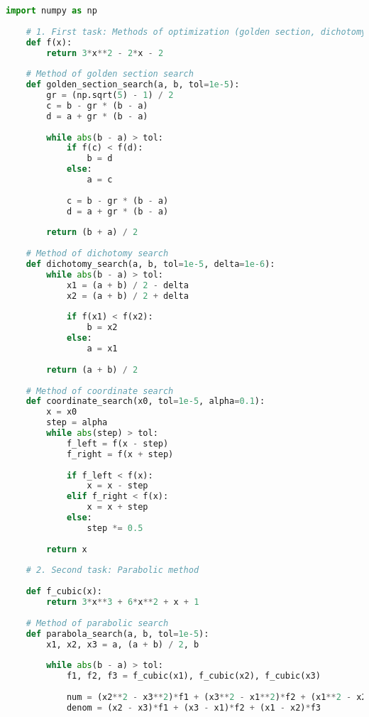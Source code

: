 \documentclass[a4paper,12pt]{article}
\begin{document}
\begin{lstlisting}[language=Python]
    import numpy as np
    
    # 1. First task: Methods of optimization (golden section, dichotomy, coordinate search)
    def f(x):
        return 3*x**2 - 2*x - 2
    
    # Method of golden section search
    def golden_section_search(a, b, tol=1e-5):
        gr = (np.sqrt(5) - 1) / 2
        c = b - gr * (b - a)
        d = a + gr * (b - a)
        
        while abs(b - a) > tol:
            if f(c) < f(d):
                b = d
            else:
                a = c
            
            c = b - gr * (b - a)
            d = a + gr * (b - a)
        
        return (b + a) / 2
    
    # Method of dichotomy search
    def dichotomy_search(a, b, tol=1e-5, delta=1e-6):
        while abs(b - a) > tol:
            x1 = (a + b) / 2 - delta
            x2 = (a + b) / 2 + delta
            
            if f(x1) < f(x2):
                b = x2
            else:
                a = x1
        
        return (a + b) / 2
    
    # Method of coordinate search
    def coordinate_search(x0, tol=1e-5, alpha=0.1):
        x = x0
        step = alpha
        while abs(step) > tol:
            f_left = f(x - step)
            f_right = f(x + step)
            
            if f_left < f(x):
                x = x - step
            elif f_right < f(x):
                x = x + step
            else:
                step *= 0.5
        
        return x
    
    # 2. Second task: Parabolic method
    
    def f_cubic(x):
        return 3*x**3 + 6*x**2 + x + 1
    
    # Method of parabolic search
    def parabola_search(a, b, tol=1e-5):
        x1, x2, x3 = a, (a + b) / 2, b
        
        while abs(b - a) > tol:
            f1, f2, f3 = f_cubic(x1), f_cubic(x2), f_cubic(x3)
            
            num = (x2**2 - x3**2)*f1 + (x3**2 - x1**2)*f2 + (x1**2 - x2**2)*f3
            denom = (x2 - x3)*f1 + (x3 - x1)*f2 + (x1 - x2)*f3
            

\end{lstlisting}
\end{document}
